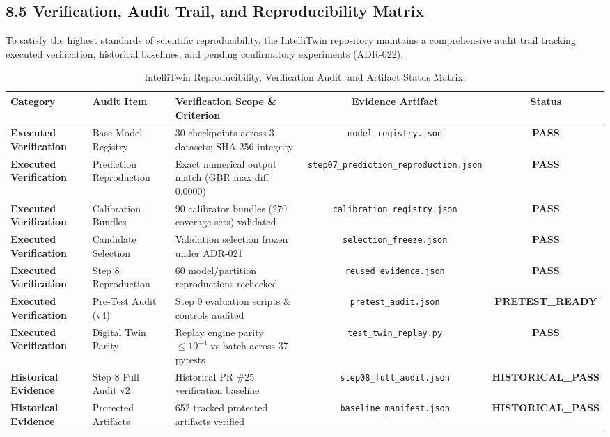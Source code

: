 \documentclass[12pt,a4paper]{article}
\begin{document}
\subsection*{8.5 Verification, Audit Trail, and Reproducibility Matrix}
To satisfy the highest standards of scientific reproducibility, the IntelliTwin repository maintains a comprehensive audit trail tracking executed verification, historical baselines, and pending confirmatory experiments (ADR-022).

\begin{table}[htbp]
\centering
\caption{IntelliTwin Reproducibility, Verification Audit, and Artifact Status Matrix.}
\label{tab:audit_matrix}
\small
\begin{tabularx}{\textwidth}{llXcc}
\toprule
\textbf{Category} & \textbf{Audit Item} & \textbf{Verification Scope \& Criterion} & \textbf{Evidence Artifact} & \textbf{Status} \\
\midrule
\textbf{Executed Verification} & Base Model Registry & 30 checkpoints across 3 datasets; SHA-256 integrity & \texttt{model\_registry.json} & \textbf{PASS} \\
\textbf{Executed Verification} & Prediction Reproduction & Exact numerical output match (GBR max diff 0.0000) & \texttt{step07\_prediction\_reproduction.json} & \textbf{PASS} \\
\textbf{Executed Verification} & Calibration Bundles & 90 calibrator bundles (270 coverage sets) validated & \texttt{calibration\_registry.json} & \textbf{PASS} \\
\textbf{Executed Verification} & Candidate Selection & Validation selection frozen under ADR-021 & \texttt{selection\_freeze.json} & \textbf{PASS} \\
\textbf{Executed Verification} & Step 8 Reproduction & 60 model/partition reproductions rechecked & \texttt{reused\_evidence.json} & \textbf{PASS} \\
\textbf{Executed Verification} & Pre-Test Audit (v4) & Step 9 evaluation scripts \& controls audited & \texttt{pretest\_audit.json} & \textbf{PRETEST\_READY} \\
\textbf{Executed Verification} & Digital Twin Parity & Replay engine parity $\le 10^{-4}$ vs batch across 37 pytests & \texttt{test\_twin\_replay.py} & \textbf{PASS} \\
\midrule
\textbf{Historical Evidence} & Step 8 Full Audit v2 & Historical PR \#25 verification baseline & \texttt{step08\_full\_audit.json} & \textbf{HISTORICAL\_PASS} \\
\textbf{Historical Evidence} & Protected Artifacts & 652 tracked protected artifacts verified & \texttt{baseline\_manifest.json} & \textbf{HISTORICAL\_PASS} \\

\end{tabularx}
\end{table}
\end{document}
